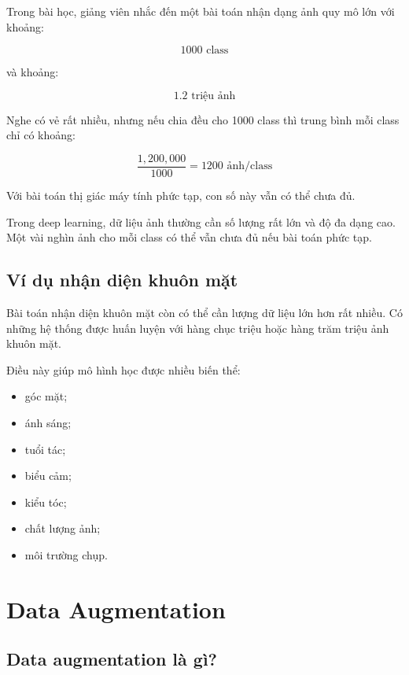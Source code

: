 \documentclass[12pt,a4paper]{report}
\begin{document}
Trong bài học, giảng viên nhắc đến một bài toán nhận dạng ảnh quy mô lớn với khoảng:

\[
    1000 \text{ class}
\]

và khoảng:

\[
    1.2 \text{ triệu ảnh}
\]

Nghe có vẻ rất nhiều, nhưng nếu chia đều cho 1000 class thì trung bình mỗi class chỉ có khoảng:

\[
    \frac{1,200,000}{1000}=1200 \text{ ảnh/class}
\]

Với bài toán thị giác máy tính phức tạp, con số này vẫn có thể chưa đủ.

\begin{ghinho}
Trong deep learning, dữ liệu ảnh thường cần số lượng rất lớn và độ đa dạng cao. Một vài nghìn ảnh cho mỗi class có thể vẫn chưa đủ nếu bài toán phức tạp.
\end{ghinho}

\section{Ví dụ nhận diện khuôn mặt}

Bài toán nhận diện khuôn mặt còn có thể cần lượng dữ liệu lớn hơn rất nhiều. Có những hệ thống được huấn luyện với hàng chục triệu hoặc hàng trăm triệu ảnh khuôn mặt.

Điều này giúp mô hình học được nhiều biến thể:

\begin{itemize}
    \item góc mặt;
    \item ánh sáng;
    \item tuổi tác;
    \item biểu cảm;
    \item kiểu tóc;
    \item chất lượng ảnh;
    \item môi trường chụp.
\end{itemize}

\chapter{Data Augmentation}

\section{Data augmentation là gì?}
\end{document}
